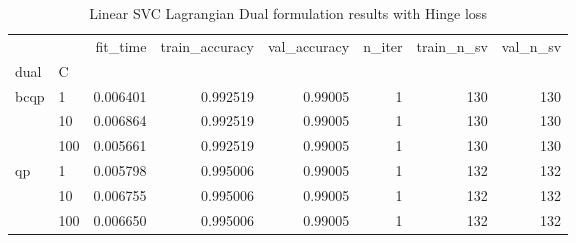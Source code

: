 \begin{table}[h!]
\centering
\caption{Linear SVC Lagrangian Dual formulation results with Hinge loss}
\label{linear_lagrangian_dual_svc_cv_results}
\begin{tabular}{llrrrrrr}
\toprule
   &     &  fit\_time &  train\_accuracy &  val\_accuracy &  n\_iter &  train\_n\_sv &  val\_n\_sv \\
dual & C &           &                 &               &         &             &           \\
\midrule
bcqp & 1   &  0.006401 &        0.992519 &       0.99005 &       1 &         130 &       130 \\
   & 10  &  0.006864 &        0.992519 &       0.99005 &       1 &         130 &       130 \\
   & 100 &  0.005661 &        0.992519 &       0.99005 &       1 &         130 &       130 \\
qp & 1   &  0.005798 &        0.995006 &       0.99005 &       1 &         132 &       132 \\
   & 10  &  0.006755 &        0.995006 &       0.99005 &       1 &         132 &       132 \\
   & 100 &  0.006650 &        0.995006 &       0.99005 &       1 &         132 &       132 \\
\bottomrule
\end{tabular}
\end{table}
